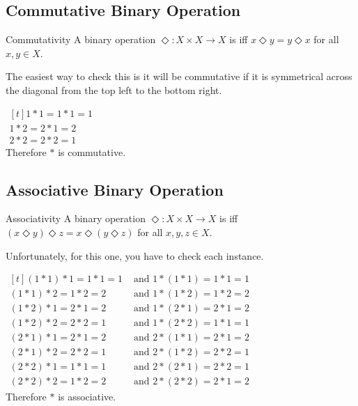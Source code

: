 \documentclass[../notes.tex]{subfiles}
\begin{document}
			\subsection{Commutative Binary Operation}
				\begin{definition}{Commutativity}
					A binary operation $\Diamond: X \times X \rightarrow X$ is  iff $x \Diamond y = y \Diamond x$ for all $x, y \in X$.
				\end{definition}
				The easiest way to check this is it will be commutative if it is symmetrical across the diagonal from the top left to the bottom right.
				\begin{example}[width=0.35\textwidth] $
					\begin{aligned}[t]
						1 * 1 = 1 * 1 = 1\\
						1 * 2 = 2 * 1 = 2\\
						2 * 2 = 2 * 2 = 1
					\end{aligned} $\\
					Therefore $*$ is commutative.
				\end{example}
			\subsection{Associative Binary Operation}
				\begin{definition}{Associativity}
					A binary operation $\Diamond: X \times X \rightarrow X$ is  iff $(x \Diamond y) \Diamond z = x \Diamond (y \Diamond z)$ for all $x, y, z \in X$.
				\end{definition}
				Unfortunately, for this one, you have to check each instance.
				\begin{example}[width=0.65\textwidth] $
					\begin{aligned}[t]
						(1 * 1) * 1 = 1 * 1 = 1 &\text{ and } 1 * (1 * 1) = 1 * 1 = 1\\
						(1 * 1) * 2 = 1 * 2 = 2 &\text{ and } 1 * (1 * 2) = 1 * 2 = 2\\
						(1 * 2) * 1 = 2 * 1 = 2 &\text{ and } 1 * (2 * 1) = 2 * 1 = 2\\
						(1 * 2) * 2 = 2 * 2 = 1 &\text{ and } 1 * (2 * 2) = 1 * 1 = 1\\
						(2 * 1) * 1 = 2 * 1 = 2 &\text{ and } 2 * (1 * 1) = 2 * 1 = 2\\
						(2 * 1) * 2 = 2 * 2 = 1 &\text{ and } 2 * (1 * 2) = 2 * 2 = 1\\
						(2 * 2) * 1 = 1 * 1 = 1 &\text{ and } 2 * (2 * 1) = 2 * 2 = 1\\
						(2 * 2) * 2 = 1 * 2 = 2 &\text{ and } 2 * (2 * 2) = 2 * 1 = 2
					\end{aligned} $\\
					Therefore $*$ is associative.
				\end{example}
			\pagebreak
\end{document}
